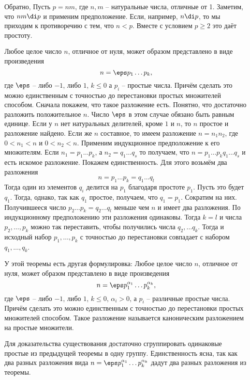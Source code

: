 Обратно,  Пусть $p=nm$, где $n,m$ -- натуральные числа, отличные от 1. Заметим, что $nm \di p$ и применим предположение. Если, например, $n \di p$, то  мы приходим к противоречию с тем, что $n<p$. Вместе с условием $p\geq 2$ это даёт простоту.
\endproof
\elm





 Любое целое число $n$, отличное от нуля, может  образом представлено в виде произведения
$$n=\eps p_1\dots p_k,$$
где $\eps$ -- либо $-1$, либо $1$, $k\leq 0$ а $p_i$ -- простые числа. Причём сделать это можно единственным с точностью до перестановки простых множителей способом.
\proof Сначала покажем, что такое разложение есть. Понятно, что достаточно разложить положительное $n$. Число $\eps$ в этом случае обязано быть равным единице. Если у $n$ нет натуральных делителей, кроме $1$ и $n$, то $n$ простое и разложение найдено. Если же $n$ составное, то имеем разложение $n=n_1n_2$, где $0<n_1<n$ и $0<n_2<n$. Применим индукционное предположение к его множителям. Если $n_1=p_1\dots p_k$, а $n_2=q_1\dots q_s$ то получаем, что $n=p_1\dots p_k q_1\dots q_s$ и есть искомое разложение.
Покажем единственность. Для этого возьмём два разложения $$n=p_1\dots p_k= q_1\dots q_l$$
Тогда один из элементов $q_i$ делится на $p_1$ благодаря простоте $p_1$. Пусть это будет $q_1$. Тогда,  однако, так как $q_1$ простое, получаем, что $q_1=p_1$. Сократим на них. Получившееся число $p_2\dots p_k=q_2\dots q_l$ меньше чем $n$  и имеет два разложения. По индукционному предположению эти разложения одинаковы. Тогда $k=l$ и числа $p_2,\dots,p_k$ можно так переставить, чтобы получились числа $q_2,\dots q_k$. Тогда и исходный набор $p_1,\dots,p_k$ с точностью до перестановки совпадает с набором $q_1,\dots,q_k$.
\endproof
\ethrm


\rm У этой теоремы есть другая формулировка: Любое целое число $n$, отличное от нуля, может  образом представлено в виде произведения
$$n=\eps p_1^{\alpha_1}\dots p_k^{\alpha_k},$$
где $\eps$ -- либо $-1$, либо $1$, $k\leq 0$, $\alpha_i>0$, а $p_i$ -- различные простые числа. Причём сделать это можно единственным с точностью до перестановки простых множителей способом. Такое разложение называется каноническим разложением на простые множители.

Для доказательства существования достаточно сгруппировать одинаковые простые из предыдущей теоремы в одну группу. Единственность ясна, так как два разных разложения  вида  $n=\eps p_1^{\alpha_1}\dots p_k^{\alpha_k}$ дадут два разных разложения из теоремы.
\erm

